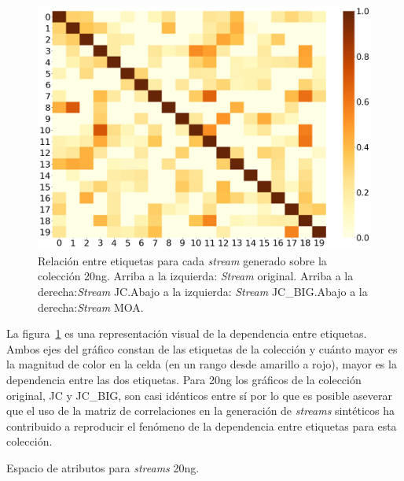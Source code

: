\begin{figure}[htbp]
	\includegraphics[width=\linewidth / 2]{figures/experiments/syn/20ng/MOA_relationship_graph.png}
	\caption[Relación entre etiquetas para cada \textit{stream} generado sobre
		la colección 20ng.]{Relación entre etiquetas para cada \textit{stream}
		generado sobre la colección 20ng. Arriba a la izquierda: \textit{Stream}
		original. Arriba a la derecha:\@ \textit{Stream} JC.\@ Abajo a la izquierda:\@
		\textit{Stream} JC\_BIG.\@ Abajo a la derecha:\@ \textit{Stream} MOA.}
	\label{fig:syn_20ng_label_relationship}
\end{figure}

La figura~\ref{fig:syn_20ng_label_relationship} es una representación visual de
la dependencia entre etiquetas. Ambos ejes del gráfico constan de las etiquetas
de la colección y cuánto mayor es la magnitud de color en la celda (en un rango
desde amarillo a rojo), mayor es la dependencia entre las dos etiquetas. Para
20ng los gráficos de la colección original, JC y JC\_BIG, son casi idénticos
entre sí por lo que es posible aseverar que el uso de la matriz de correlaciones
en la generación de \textit{streams} sintéticos ha contribuido a reproducir el
fenómeno de la dependencia entre etiquetas para esta colección.

\begin{table}[htbp]
	\centering
	\begin{adjustbox}{max width=\textwidth}
		
	\end{adjustbox}
	\caption{Espacio de atributos para \textit{streams} 20ng.}
	\label{tab:syn_20ng_features_space}
\end{table}

